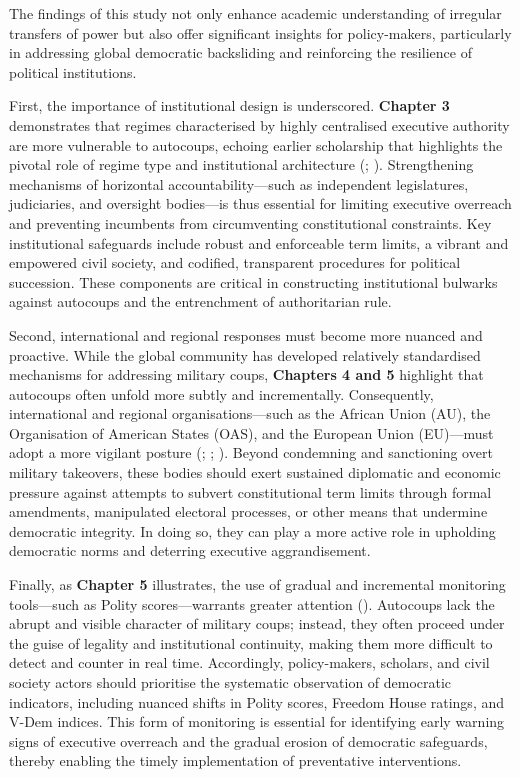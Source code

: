 \documentclass[
  12pt,
]{report}
\begin{document}
The findings of this study not only enhance academic understanding of
irregular transfers of power but also offer significant insights for
policy-makers, particularly in addressing global democratic backsliding
and reinforcing the resilience of political institutions.

First, the importance of institutional design is underscored.
\textbf{Chapter 3} demonstrates that regimes characterised by highly
centralised executive authority are more vulnerable to autocoups,
echoing earlier scholarship that highlights the pivotal role of regime
type and institutional architecture (; ).
Strengthening mechanisms of horizontal accountability---such as
independent legislatures, judiciaries, and oversight bodies---is thus
essential for limiting executive overreach and preventing incumbents
from circumventing constitutional constraints. Key institutional
safeguards include robust and enforceable term limits, a vibrant and
empowered civil society, and codified, transparent procedures for
political succession. These components are critical in constructing
institutional bulwarks against autocoups and the entrenchment of
authoritarian rule.

Second, international and regional responses must become more nuanced
and proactive. While the global community has developed relatively
standardised mechanisms for addressing military coups, \textbf{Chapters
4 and 5} highlight that autocoups often unfold more subtly and
incrementally. Consequently, international and regional
organisations---such as the African Union (AU), the Organisation of
American States (OAS), and the European Union (EU)---must adopt a more
vigilant posture (;
;
). Beyond condemning and
sanctioning overt military takeovers, these bodies should exert
sustained diplomatic and economic pressure against attempts to subvert
constitutional term limits through formal amendments, manipulated
electoral processes, or other means that undermine democratic integrity.
In doing so, they can play a more active role in upholding democratic
norms and deterring executive aggrandisement.

Finally, as \textbf{Chapter 5} illustrates, the use of gradual and
incremental monitoring tools---such as Polity scores---warrants greater
attention ().
Autocoups lack the abrupt and visible character of military coups;
instead, they often proceed under the guise of legality and
institutional continuity, making them more difficult to detect and
counter in real time. Accordingly, policy-makers, scholars, and civil
society actors should prioritise the systematic observation of
democratic indicators, including nuanced shifts in Polity scores,
Freedom House ratings, and V-Dem indices. This form of monitoring is
essential for identifying early warning signs of executive overreach and
the gradual erosion of democratic safeguards, thereby enabling the
timely implementation of preventative interventions.
\end{document}
